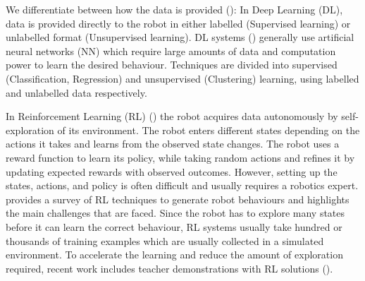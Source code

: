 We differentiate between how the data is provided (): 
In Deep Learning (DL), data is provided directly to the robot in either labelled (Supervised learning) or unlabelled format (Unsupervised learning).
DL systems (\cite{schmidhuber2015deep}) generally use artificial neural networks (NN) which require large amounts of data and computation power to learn the desired behaviour.
Techniques are divided into supervised (\eg Classification, Regression) and unsupervised (\eg Clustering) learning, using labelled and unlabelled data respectively.

In Reinforcement Learning (RL)  (\cite{sutton1998reinforcement,kaelbling1996reinforcement,gosavi2009reinforcement}) the robot acquires data autonomously by self-exploration of its environment.
The robot enters different states depending on the actions it takes and learns from the observed state changes.
The robot uses a reward function to learn its policy, while taking random actions and refines it by updating expected rewards with observed outcomes.
However, setting up the states, actions, and policy is often difficult and usually requires a robotics expert.
\cite{kober2013reinforcement} provides a survey of RL techniques to generate robot behaviours and highlights the main challenges that are faced.
Since the robot has to explore many states before it can learn the correct behaviour, RL systems usually take hundred or thousands of training examples which are usually collected in a simulated environment.
To accelerate the learning and reduce the amount of exploration required, recent work includes teacher demonstrations with RL solutions (\cite{martinez2017relational,hester2017learning}).




